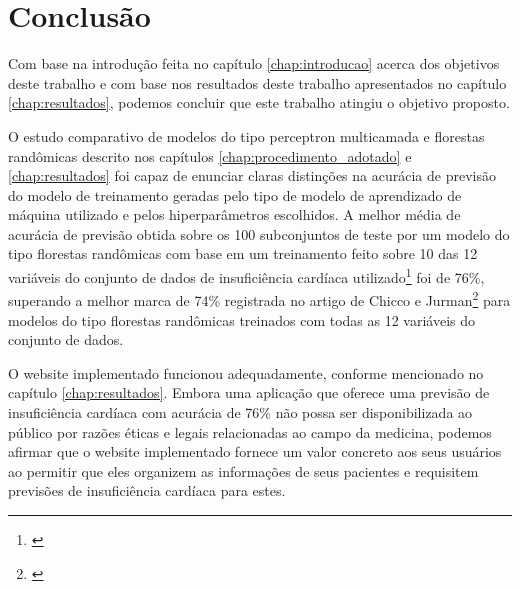 \chapter{Conclusão} \label{chap:conclusao}

Com base na introdução feita no capítulo \ref{chap:introducao} acerca dos objetivos deste trabalho e com base nos resultados deste trabalho apresentados no capítulo \ref{chap:resultados}, podemos concluir que este trabalho atingiu o objetivo proposto.

O estudo comparativo de modelos do tipo perceptron multicamada e florestas randômicas descrito nos capítulos \ref{chap:procedimento_adotado} e \ref{chap:resultados} foi capaz de enunciar claras distinções na acurácia de previsão do modelo de treinamento geradas pelo tipo de modelo de aprendizado de máquina utilizado e pelos hiperparâmetros escolhidos. A melhor média de acurácia de previsão obtida sobre os 100 subconjuntos de teste por um modelo do tipo florestas randômicas com base em um treinamento feito sobre 10 das 12 variáveis do conjunto de dados de insuficiência cardíaca utilizado\footnote{\cite{larxel_dataset}} foi de 76\%, superando a melhor marca de 74\% registrada no artigo de Chicco e Jurman\footnote{\cite{chicco2020}} para modelos do tipo florestas randômicas treinados com todas as 12 variáveis do conjunto de dados.

O website implementado funcionou adequadamente, conforme mencionado no capítulo \ref{chap:resultados}. Embora uma aplicação que oferece uma previsão de insuficiência cardíaca com acurácia de 76\% não possa ser disponibilizada ao público por razões éticas e legais relacionadas ao campo da medicina, podemos afirmar que o website implementado fornece um valor concreto aos seus usuários ao permitir que eles organizem as informações de seus pacientes e requisitem previsões de insuficiência cardíaca para estes.
